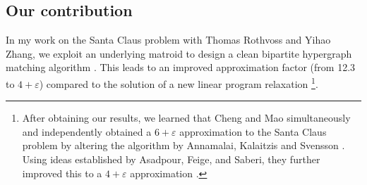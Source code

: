 


\subsection{Our contribution }
In my work on the Santa Claus problem with Thomas Rothvoss and Yihao Zhang,
we exploit an underlying matroid to design a clean bipartite hypergraph matching algorithm \cite{DaviesRZ20}. 
This leads to an improved approximation factor (from 12.3 to $4+ \varepsilon$) compared to the solution of a new linear program relaxation
\footnote{After obtaining our results, 
we learned that Cheng and Mao simultaneously and independently obtained 
a $6 + \varepsilon$ approximation to the Santa Claus problem
by altering the algorithm by Annamalai, Kalaitzis and Svensson \cite{ChengM18}.  
Using ideas established by Asadpour, Feige, and Saberi, they further improved this
to a $4 + \varepsilon$ approximation \cite{CM19, SantaClaus-AsadpourFeigeSaberi-APPROX2008}.}.

